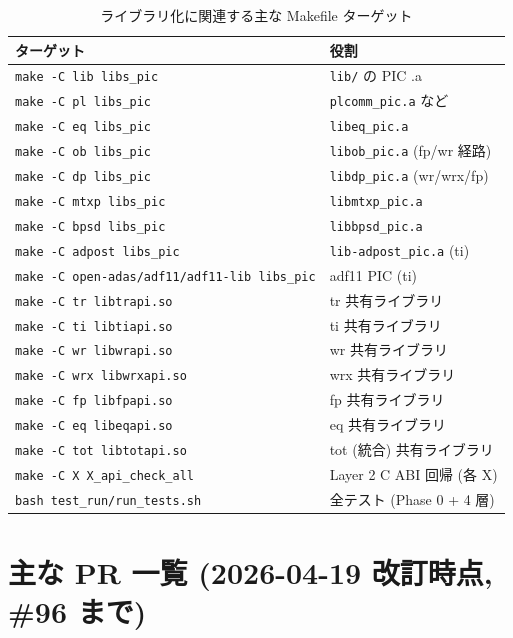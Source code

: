 \documentclass[11pt,a4paper]{report}
\begin{document}
\begin{longtable}{@{}p{6cm}p{8cm}@{}}
\caption{ライブラリ化に関連する主な Makefile ターゲット}\\
\toprule
\textbf{ターゲット} & \textbf{役割} \\ \midrule \endhead
\texttt{make -C lib libs\_pic}        & \texttt{lib/} の PIC .a \\
\texttt{make -C pl  libs\_pic}        & \texttt{plcomm\_pic.a} など \\
\texttt{make -C eq  libs\_pic}        & \texttt{libeq\_pic.a} \\
\texttt{make -C ob  libs\_pic}        & \texttt{libob\_pic.a} (fp/wr 経路) \\
\texttt{make -C dp  libs\_pic}        & \texttt{libdp\_pic.a} (wr/wrx/fp) \\
\texttt{make -C mtxp libs\_pic}       & \texttt{libmtxp\_pic.a} \\
\texttt{make -C bpsd libs\_pic}       & \texttt{libbpsd\_pic.a} \\
\texttt{make -C adpost libs\_pic}     & \texttt{lib-adpost\_pic.a} (ti) \\
\texttt{make -C open-adas/adf11/adf11-lib libs\_pic} & adf11 PIC (ti) \\
\texttt{make -C tr  libtrapi.so}      & tr 共有ライブラリ \\
\texttt{make -C ti  libtiapi.so}      & ti 共有ライブラリ \\
\texttt{make -C wr  libwrapi.so}      & wr 共有ライブラリ \\
\texttt{make -C wrx libwrxapi.so}     & wrx 共有ライブラリ \\
\texttt{make -C fp  libfpapi.so}      & fp 共有ライブラリ \\
\texttt{make -C eq  libeqapi.so}      & eq 共有ライブラリ \\
\texttt{make -C tot libtotapi.so}     & tot (統合) 共有ライブラリ \\
\texttt{make -C X  X\_api\_check\_all}  & Layer 2 C ABI 回帰 (各 X) \\
\texttt{bash test\_run/run\_tests.sh} & 全テスト (Phase 0 + 4 層) \\
\bottomrule
\end{longtable}

\section{主な PR 一覧 (2026-04-19 改訂時点, \#96 まで)}
\end{document}

